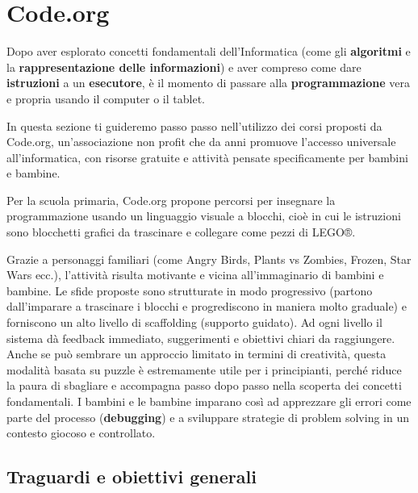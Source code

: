 \chapter{Code.org}\label{capitolo-7-code.org}
\raggedbottom

Dopo aver esplorato concetti fondamentali dell'Informatica (come gli \textbf{algoritmi} e la \textbf{rappresentazione delle informazioni}) e aver compreso come dare \textbf{istruzioni} a un \textbf{esecutore}, è il momento di passare alla \textbf{programmazione} vera e propria usando il computer o il tablet.

In questa sezione ti guideremo passo passo nell'utilizzo dei corsi proposti da Code.org, un'associazione non profit che da anni promuove l'accesso universale all'informatica, con risorse gratuite e attività pensate specificamente per bambini e bambine.

Per la scuola primaria, Code.org propone percorsi per insegnare la programmazione usando un linguaggio visuale a blocchi, cioè in cui le istruzioni sono blocchetti grafici da trascinare e collegare come pezzi di LEGO®.

Grazie a personaggi familiari (come Angry Birds, Plants vs Zombies, Frozen, Star Wars ecc.), l'attività risulta motivante e vicina all'immaginario di bambini e bambine. Le sfide proposte sono strutturate in modo progressivo (partono dall'imparare a trascinare i blocchi e progrediscono in maniera molto graduale) e forniscono un alto livello di scaffolding (supporto guidato). Ad ogni livello il sistema dà feedback immediato, suggerimenti e obiettivi chiari da raggiungere. Anche se può sembrare un approccio limitato in termini di creatività, questa modalità basata su puzzle è estremamente utile per i principianti, perché riduce la paura di sbagliare e accompagna passo dopo passo nella scoperta dei concetti fondamentali. I bambini e le bambine imparano così ad apprezzare gli errori come parte del processo (\textbf{debugging}) e a sviluppare strategie di problem solving in un contesto giocoso e controllato.

\section{Traguardi e obiettivi generali }\label{traguardi-e-obiettivi-generali-4}

